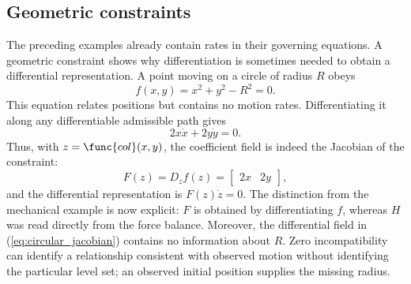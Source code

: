 \subsection{Geometric constraints}
The preceding examples already contain rates in their governing equations. A
geometric constraint shows why differentiation is sometimes needed to obtain
a differential representation. A point moving on a circle of radius $R$
obeys 
\begin{equation}
f(x,y)=x^2+y^2-R^2=0.  \label{eq:circular_constraint}
\end{equation}
This equation relates positions but contains no motion rates.
Differentiating it along any differentiable admissible path gives 
\begin{equation}
2x\dot x+2y\dot y=0.  \label{eq:circular_differential}
\end{equation}
Thus, with $z=\func{col}(x,y)$, the coefficient field is indeed the Jacobian
of the constraint: 
\begin{equation}
F(z)=D_zf(z)=%
\begin{bmatrix}
2x & 2y%
\end{bmatrix}%
,  \label{eq:circular_jacobian}
\end{equation}
and the differential representation is $F(z)\dot z=0$. The distinction from
the mechanical example is now explicit: $F$ is obtained by differentiating $%
f $, whereas $H$ was read directly from the force balance. Moreover, the
differential field in (\ref{eq:circular_jacobian}) contains no information
about $R$. Zero incompatibility can identify a relationship consistent with
observed motion without identifying the particular level set; an observed
initial position supplies the missing radius.

